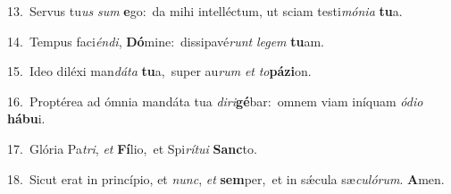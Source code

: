 {\numbfont\textcolor{\numbcolor}{13.}}~Servus tu\textit{us} \textit{sum} \textbf{e}\-go:~\star da mihi intelléctum, ut sciam testi\-\textit{mó}\-\textit{ni}\textit{a} \textbf{tu}\-a.\par
{\numbfont\textcolor{\numbcolor}{14.}}~Tempus faci\-\textit{én}\-\textit{di}, \textbf{Dó}\-mine:~\star dissipavé\textit{runt} \textit{le}\-\textit{gem} \textbf{tu}\-am.\par
{\numbfont\textcolor{\numbcolor}{15.}}~Ideo diléxi man\-\textit{dá}\-\textit{ta} \textbf{tu}\-a,~\star super au\textit{rum} \textit{et} \textit{to}\-\textbf{pá}\textbf{zi}on.\par
{\numbfont\textcolor{\numbcolor}{16.}}~Proptérea ad ómnia mandáta tua \textit{di}\-\textit{ri}\textbf{gé}bar:~\star omnem viam iníquam \textit{ó}\-\textit{di}\textit{o} \textbf{há}\-\textbf{bu}i.\par
{\numbfont\textcolor{\numbcolor}{17.}}~Glória Pa\-\textit{tri}\-, \textit{et} \textbf{Fí}\-lio,~\star et Spi\-\textit{rí}\-\textit{tu}\textit{i} \textbf{Sanc}\-to.\par
{\numbfont\textcolor{\numbcolor}{18.}}~Sicut erat in princípio, et \textit{nunc}\-, \textit{et} \textbf{sem}\-per,~\star et in sǽcula sæ\-\textit{cu}\-\textit{ló}\textit{rum}. \textbf{A}\-men.\par

